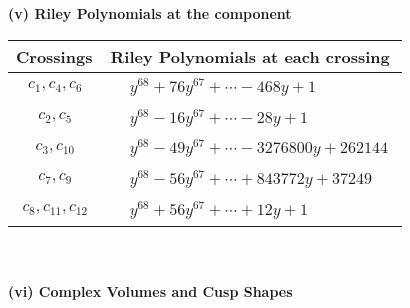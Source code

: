 \documentclass[1p]{elsarticle_modified}
\theoremstyle{definition}
\begin{document}
\newpage\renewcommand{\arraystretch}{1}
\flushleft \textbf{(v) Riley Polynomials at the component}\newline \\
\begin{tabular}{m{50pt}|m{274pt}}
Crossings & \hspace{64pt}Riley Polynomials at each crossing \\
\hline $$\begin{aligned}c_{1},c_{4},c_{6}\end{aligned}$$&$\begin{aligned}
&y^{68}+76 y^{67}+\cdots-468 y+1
\end{aligned}$\\
\hline $$\begin{aligned}c_{2},c_{5}\end{aligned}$$&$\begin{aligned}
&y^{68}-16 y^{67}+\cdots-28 y+1
\end{aligned}$\\
\hline $$\begin{aligned}c_{3},c_{10}\end{aligned}$$&$\begin{aligned}
&y^{68}-49 y^{67}+\cdots-3276800 y+262144
\end{aligned}$\\
\hline $$\begin{aligned}c_{7},c_{9}\end{aligned}$$&$\begin{aligned}
&y^{68}-56 y^{67}+\cdots+843772 y+37249
\end{aligned}$\\
\hline $$\begin{aligned}c_{8},c_{11},c_{12}\end{aligned}$$&$\begin{aligned}
&y^{68}+56 y^{67}+\cdots+12 y+1
\end{aligned}$\\
\hline
\end{tabular}\\~\\
\newpage\flushleft \textbf{(vi) Complex Volumes and Cusp Shapes}
\end{document}
